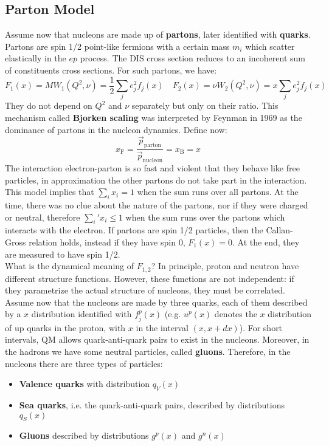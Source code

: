 \documentclass[10.75pt,a4paper,openright,bottom=2cm]{article}
\begin{document}
\subsection{Parton Model}
Assume now that nucleons are made up of \textbf{partons}, later identified with \textbf{quarks}. Partons are spin 1/2 point-like fermions with a certain mass $m_i$  which scatter elastically in the $ep$ process. The DIS cross section reduces to an incoherent sum of constituents cross sections. For such partons, we have:
\[
F_1(x)=MW_1(Q^2,\nu)=\frac{1}{2}\sum_je_j^2f_j(x) \quad F_2(x)=\nu W_2(Q^2,\nu)=x\sum_je_j^2f_j(x)
\]
They do not depend on $Q^2$ and $\nu$ separately but only on their ratio. This mechanism called \textbf{Bjorken scaling} was interpreted by Feynman in 1969 as the dominance of partons in the nucleon dynamics. 
Define now:
\[
x_{\text{F}}=\frac{\Vec{p}_{\text{parton}}}{\Vec{p}_{\text{nucleon}}}=x_{\text{B}}=x
\]
The interaction electron-parton is so fast and violent that they behave like free particles, in  approximation the other partons do not take part in the interaction.\\
This model implies that $\sum_ix_i=1$ when the sum runs over all partons. At the time, there was no clue about the nature of the partons, nor if they were charged or neutral, therefore $\sum_i'x_i\le1$ when the sum runs over the partons which interacts with the electron. If partons are spin 1/2 particles, then the Callan-Gross relation holds, instead if they have spin 0, $F_1(x)=0$. At the end, they are measured to have spin 1/2.\\
What is the dynamical meaning of $F_{1,2}$? In principle, proton and neutron have different structure functions. However, these functions are not independent: if they parametrize the actual structure of nucleons, they must be correlated. Assume now that the nucleons are made by three quarks, each of them described by a $x$ distribution identified with $f_j^p(x)$ (e.g. $u^p(x)$ denotes the $x$ distribution of up quarks in the proton, with $x$ in the interval $(x,x+dx)$). For short intervals, QM allows quark-anti-quark pairs to exist in the nucleons. Moreover, in the hadrons we have some neutral particles, called \textbf{gluons}. Therefore, in the nucleons there are three types of particles:
\begin{itemize}
    \item \textbf{Valence quarks} with distribution $q_V(x)$
    \item \textbf{Sea quarks}, i.e. the quark-anti-quark pairs, described by distributions $q_S(x)$
    \item \textbf{Gluons} described by distributions $g^p(x)$ and $g^n(x)$
\end{itemize}
\end{document}
